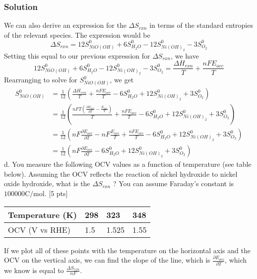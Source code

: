 \documentclass[12pt]{article}
\begin{document}
\subsubsection{Solution}
We can also derive an expression for the $\Delta S_{rxn}$ in terms of the standard entropies of the relevant species. The expression would be
\begin{equation}
    \Delta S_{rxn} = 12S^0_{NiO(OH)} + 6S^0_{H_2O} - 12S^0_{Ni(OH)_2} - 3S^0_{O_2}
\end{equation}
Setting this equal to our previous expression for $\Delta S_{rxn}$, we have
\begin{equation}
    12S^0_{NiO(OH)} + 6S^0_{H_2O} - 12S^0_{Ni(OH)_2} - 3S^0_{O_2} = \frac{\Delta H_{rxn}}{T} + \frac{nFE_{ocv}}{T}
\end{equation}
Rearranging to solve for $S^0_{NiO(OH)}$, we get
\begin{align}
    S^0_{NiO(OH)} &= \frac{1}{12} \left( \frac{\Delta H_{rxn}}{T} + \frac{nFE_{ocv}}{T} - 6S^0_{H_2O} + 12S^0_{Ni(OH)_2} + 3S^0_{O_2} \right) \\
    &= \frac{1}{12} \left( \frac{nFT \left( \frac{\partial E_{ocv}}{\partial T} - \frac{E_{ocv}}{T} \right)}{T} + \frac{nFE_{ocv}}{T} - 6S^0_{H_2O} + 12S^0_{Ni(OH)_2} + 3S^0_{O_2} \right) \\
    &= \frac{1}{12} \left( nF \frac{\partial E_{ocv}}{\partial T} - nF \frac{E_{ocv}}{T} + \frac{nFE_{ocv}}{T} - 6S^0_{H_2O} + 12S^0_{Ni(OH)_2} + 3S^0_{O_2} \right) \\
    &= \frac{1}{12} \left( nF \frac{\partial E_{ocv}}{\partial T} - 6S^0_{H_2O} + 12S^0_{Ni(OH)_2} + 3S^0_{O_2} \right)
\end{align}
d. You measure the following OCV values as a function of temperature (see table below). Assuming the OCV reflects the reaction of nickel hydroxide to nickel oxide hydroxide, what is the $\Delta S_{r x n}$ ? You can assume Faraday's constant is $100000 \mathrm{C} / \mathrm{mol}$. [5 pts]

\begin{center}
\begin{tabular}{llll}
\hline\hline
Temperature (K) & 298 & 323 & 348 \\
\hline
OCV (V vs RHE) & 1.5 & 1.525 & 1.55 \\
\hline\hline
\end{tabular}
\end{center}
If we plot all of these points with the temperature on the horizontal axis and the OCV on the vertical axis, we can find the slope of the line, which is $\frac{\partial E_{ocv}}{\partial T}$, which we know is equal to $\frac{\Delta S_{rxn}}{nF}$.
\end{document}
